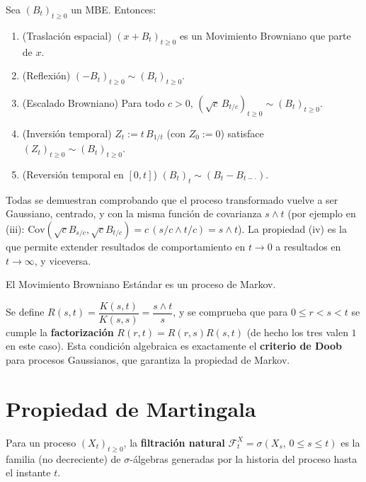 \begin{prop}
Sea $(B_t)_{t\ge0}$ un MBE. Entonces:
\begin{enumerate}
    \item[(i)] (Traslación espacial) $(x+B_t)_{t\ge0}$ es un Movimiento Browniano que parte de $x$.
    \item[(ii)] (Reflexión) $(-B_t)_{t\ge0} \sim (B_t)_{t\ge0}$.
    \item[(iii)] (Escalado Browniano) Para todo $c>0$, $(\sqrt{c}\,B_{t/c})_{t\ge0} \sim (B_t)_{t\ge0}$.
    \item[(iv)] (Inversión temporal) $Z_t := t\,B_{1/t}$ (con $Z_0:=0$) satisface $(Z_t)_{t\ge0}\sim(B_t)_{t\ge0}$.
    \item[(v)] (Reversión temporal en $[0,t]$) $(B_t)_{t} \sim (B_t - B_{t-\cdot})$.
\end{enumerate}
\end{prop}
\begin{observacion}
Todas se demuestran comprobando que el proceso transformado vuelve a ser Gaussiano, centrado, y con la misma función de covarianza $s\wedge t$ (por ejemplo en (iii): $\text{Cov}(\sqrt{c}B_{s/c},\sqrt{c}B_{t/c}) = c\,(s/c \wedge t/c)= s\wedge t$). La propiedad (iv) es la que permite extender resultados de comportamiento en $t\to0$ a resultados en $t\to\infty$, y viceversa.
\end{observacion}

\begin{prop}
El Movimiento Browniano Estándar es un proceso de Markov.
\end{prop}
\begin{observacion}
Se define $R(s,t)=\dfrac{K(s,t)}{K(s,s)} = \dfrac{s\wedge t}{s}$, y se comprueba que para $0\le r<s<t$ se cumple la \textbf{factorización} $R(r,t)=R(r,s)R(s,t)$ (de hecho los tres valen $1$ en este caso). Esta condición algebraica es exactamente el \textbf{criterio de Doob} para procesos Gaussianos, que garantiza la propiedad de Markov.
\end{observacion}

\section{Propiedad de Martingala}

\begin{definicion}
Para un proceso $(X_t)_{t\ge0}$, la \textbf{filtración natural} $\mathcal{F}_t^X = \sigma(X_s,\, 0\le s\le t)$ es la familia (no decreciente) de $\sigma$-álgebras generadas por la historia del proceso hasta el instante $t$.
\end{definicion}

